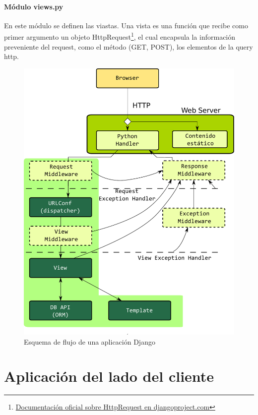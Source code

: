 \documentclass[a4paper]{report}
\begin{document}
\subsubsection*{Módulo views.py}
En este módulo se definen las viastas. Una vista es una función que recibe como primer
argumento un objeto HttpRequest\footnote{
\href{http://docs.djangoproject.com/en/dev/ref/request-response/\#httprequest-objects}
{Documentación oficial sobre HttpRequest en djangoproject.com}}, el cual encapsula la información preveniente del request, 
como el método (GET, POST), los elementos de la query http.
\begin{figure}[htp]
\centering
\includegraphics[scale=0.40]{img/django_strucure.pdf}
\caption{Esquema de flujo de una aplicación Django}\label{fig:erptsqfit}
\end{figure}




\chapter{Aplicación del lado del cliente}
\end{document}
